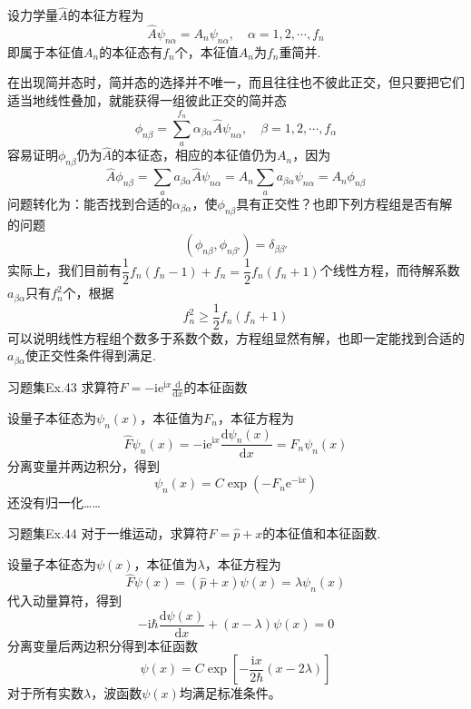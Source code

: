 设力学量$\hat{A}$的本征方程为
$$
    \hat{A}\psi_{n\alpha}=A_n\psi_{n\alpha}, \quad \alpha =1, 2, \cdots, f_n
$$
即属于本征值$A_n$的本征态有$f_n$个，本征值$A_n$为$f_n$重简并.

在出现简并态时，简并态的选择并不唯一，而且往往也不彼此正交，但只要把它们适当地线性叠加，就能获得一组彼此正交的简并态
$$
    \phi_{n\beta} = \sum_{a}^{f_n} \alpha_{\beta\alpha}\hat{A}\psi_{n\alpha}, \quad \beta = 1, 2, \cdots, f_{\alpha}
$$
容易证明$\phi_{n\beta}$仍为$\hat{A}$的本征态，相应的本征值仍为$A_n$，因为
$$
    \hat{A}\phi_{n\beta}
    = \sum_{a}a_{\beta\alpha}\hat{A}\psi_{n\alpha}
    = A_n\sum_{a}a_{\beta\alpha}\psi_{n\alpha}
    = A_n\phi_{n\beta}
$$
问题转化为：能否找到合适的$\alpha_{\beta\alpha}$，使$\phi_{n\beta}$具有正交性？也即下列方程组是否有解的问题
$$
    \left(\phi_{n\beta}, \phi_{n\beta'}\right)=\delta_{\beta\beta'}
$$
实际上，我们目前有$\dfrac{1}{2}f_n(f_n-1)+f_n=\dfrac{1}{2}f_n(f_n+1)$个线性方程，而待解系数$a_{\beta\alpha}$只有$f_n^2$个，根据
$$
    f_n^2 \geqslant \frac{1}{2}f_n(f_n+1)
$$
可以说明线性方程组个数多于系数个数，方程组显然有解，也即一定能找到合适的$a_{\beta\alpha}$使正交性条件得到满足.

\begin{question}{习题集Ex.43}
    求算符$\displaystyle \hat{F}=-\mathrm{ie}^{\mathrm{i}x}\frac{\mathrm{d}}{\mathrm{d}x}$的本征函数
\end{question}
\begin{solution}
    设量子本征态为$\psi_n(x)$，本征值为$F_n$，本征方程为
    $$
        \hat{F}\psi_n(x) = -\mathrm{ie}^{\mathrm{i}x}\frac{\mathrm{d}\psi_n(x)}{\mathrm{d}x} = F_n\psi_n(x)
    $$
    分离变量并两边积分，得到
    $$
        \psi_n(x)=C\exp\left(-F_n\mathrm{e}^{-\mathrm{i}x}\right)
    $$
    还没有归一化……
\end{solution}



\begin{question}{习题集Ex.44}
    对于一维运动，求算符$\hat{F}=\hat{p}+x$的本征值和本征函数.
\end{question}
\begin{solution}
    设量子本征态为$\psi(x)$，本征值为$\lambda$，本征方程为
    $$
        \hat{F}\psi(x) = (\hat{p}+x)\psi(x) = \lambda\psi_n(x)
    $$
    代入动量算符，得到
    $$
        -\mathrm{i}\hbar\frac{\mathrm{d}\psi(x)}{\mathrm{d}x}+(x-\lambda)\psi(x)=0
    $$
    分离变量后两边积分得到本征函数
    $$
        \psi(x) = C\exp\left[-\frac{\mathrm{i}x}{2\hbar}(x-2\lambda)\right]
    $$
    对于所有实数$\lambda$，波函数$\psi(x)$均满足标准条件。
\end{solution}



